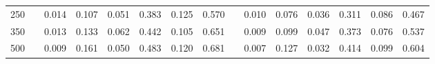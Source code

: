 % 
\begin{tabular}{ccccccccccccccc}
  \hline
  \hline
250 &  & 0.014 & 0.107 & 0.051 & 0.383 & 0.125 & 0.570 &  & 0.010 & 0.076 & 0.036 & 0.311 & 0.086 & 0.467 \\ 
  350 &  & 0.013 & 0.133 & 0.062 & 0.442 & 0.105 & 0.651 &  & 0.009 & 0.099 & 0.047 & 0.373 & 0.076 & 0.537 \\ 
  500 &  & 0.009 & 0.161 & 0.050 & 0.483 & 0.120 & 0.681 &  & 0.007 & 0.127 & 0.032 & 0.414 & 0.099 & 0.604 \\ 
   \hline
\end{tabular}
